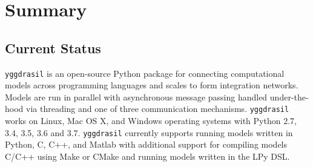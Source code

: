 \documentclass[journal]{IEEEtran}
\newcommand{\pkg}{{\tt yggdrasil}{}}
\begin{document}
\section{Summary}\label{S:discuss}

\subsection{Current Status}\label{SS:current}
%
{\pkg} is an open-source Python package for connecting computational models across programming languages and scales to form integration networks. Models are run in parallel with asynchronous message passing handled under-the-hood via threading and one of three communication mechanisms. {\pkg} works on Linux, Mac OS X, and Windows operating systems with Python 2.7, 3.4, 3.5, 3.6 and 3.7. {\pkg} currently supports running models written in Python, C, C++, and Matlab with additional support for compiling models C/C++ using Make \citep{Stallman2004} or CMake \citep{Martin2006} and running models written in the LPy \citep{Boudon2012} DSL.

\end{document}
